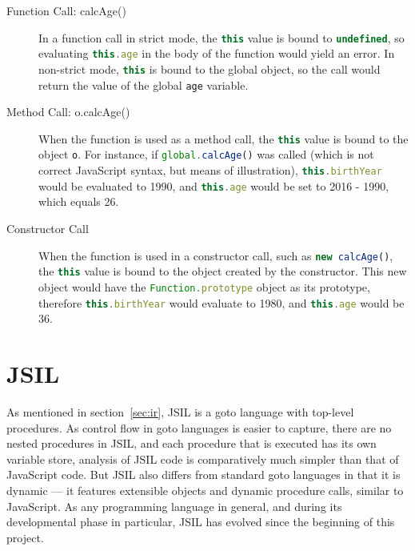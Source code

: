 \documentclass[a4paper,11pt,twoside]{report}
\def\jsinline{\lstinline[language=JavaScript, basicstyle=\small]}%\end{lstlisting}
\begin{document}
\begin{description}
\item[Function Call: calcAge()] In a function call in strict mode, the \jsinline|this| value is bound to \jsinline|undefined|, so evaluating \jsinline|this.age| in the body of the function would yield an error. In non-strict mode, \jsinline|this| is bound to the global object, so the call would return the value of the global \jsinline|age| variable.

\item[Method Call: o.calcAge()] When the function is used as a method call, the \jsinline|this| value is bound to the object \jsinline|o|. For instance, if \jsinline|global.calcAge()| was called (which is not correct JavaScript syntax, but means of illustration), \jsinline|this.birthYear| would be evaluated to 1990, and \jsinline|this.age| would be set to 2016 - 1990, which equals 26.

\item[Constructor Call] When the function is used in a constructor call, such as \jsinline|new calcAge()|, the \jsinline|this| value is bound to the object created by the constructor. This new object would have the \jsinline|Function.prototype| object as its prototype, therefore \jsinline|this.birthYear| would evaluate to 1980, and \jsinline|this.age| would be 36.
\end{description}


\chapter{JSIL}\label{sec:jsil}
As mentioned in section~\ref{sec:ir}, JSIL is a goto language with top-level procedures. As control flow in goto languages is easier to capture, there are no nested procedures in JSIL, and each procedure that is executed has its own variable store, analysis of JSIL code is comparatively much simpler than that of JavaScript code. But JSIL also differs from standard goto languages in that it is dynamic --- it features extensible objects and dynamic procedure calls, similar to JavaScript. As any programming language in general, and during its developmental phase in particular, JSIL has evolved since the beginning of this project. 
\end{document}
